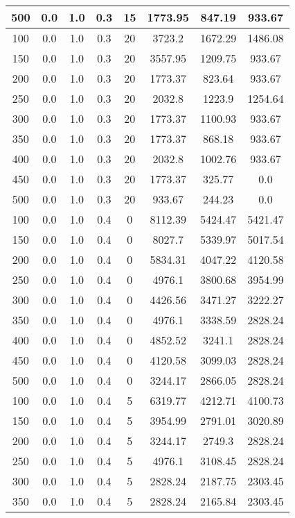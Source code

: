 \documentclass[a4paper, 12pt]{extreport}
\begin{document}
\begin{itemize}
\begin{longtable}{|c|c|c|c|c|c|c|c|}
			500 & 0.0 & 1.0 & 0.3 & 15 & 1773.95 & 847.19 & 933.67 \\\hline
			100 & 0.0 & 1.0 & 0.3 & 20 & 3723.2 & 1672.29 & 1486.08 \\\hline
			150 & 0.0 & 1.0 & 0.3 & 20 & 3557.95 & 1209.75 & 933.67 \\\hline
			200 & 0.0 & 1.0 & 0.3 & 20 & 1773.37 & 823.64 & 933.67 \\\hline
			250 & 0.0 & 1.0 & 0.3 & 20 & 2032.8 & 1223.9 & 1254.64 \\\hline
			300 & 0.0 & 1.0 & 0.3 & 20 & 1773.37 & 1100.93 & 933.67 \\\hline
			350 & 0.0 & 1.0 & 0.3 & 20 & 1773.37 & 868.18 & 933.67 \\\hline
			400 & 0.0 & 1.0 & 0.3 & 20 & 2032.8 & 1002.76 & 933.67 \\\hline
			450 & 0.0 & 1.0 & 0.3 & 20 & 1773.37 & 325.77 & 0.0 \\\hline
			500 & 0.0 & 1.0 & 0.3 & 20 & 933.67 & 244.23 & 0.0 \\\hline
			100 & 0.0 & 1.0 & 0.4 & 0 & 8112.39 & 5424.47 & 5421.47 \\\hline
			150 & 0.0 & 1.0 & 0.4 & 0 & 8027.7 & 5339.97 & 5017.54 \\\hline
			200 & 0.0 & 1.0 & 0.4 & 0 & 5834.31 & 4047.22 & 4120.58 \\\hline
			250 & 0.0 & 1.0 & 0.4 & 0 & 4976.1 & 3800.68 & 3954.99 \\\hline
			300 & 0.0 & 1.0 & 0.4 & 0 & 4426.56 & 3471.27 & 3222.27 \\\hline
			350 & 0.0 & 1.0 & 0.4 & 0 & 4976.1 & 3338.59 & 2828.24 \\\hline
			400 & 0.0 & 1.0 & 0.4 & 0 & 4852.52 & 3241.1 & 2828.24 \\\hline
			450 & 0.0 & 1.0 & 0.4 & 0 & 4120.58 & 3099.03 & 2828.24 \\\hline
			500 & 0.0 & 1.0 & 0.4 & 0 & 3244.17 & 2866.05 & 2828.24 \\\hline
			100 & 0.0 & 1.0 & 0.4 & 5 & 6319.77 & 4212.71 & 4100.73 \\\hline
			150 & 0.0 & 1.0 & 0.4 & 5 & 3954.99 & 2791.01 & 3020.89 \\\hline
			200 & 0.0 & 1.0 & 0.4 & 5 & 3244.17 & 2749.3 & 2828.24 \\\hline
			250 & 0.0 & 1.0 & 0.4 & 5 & 4976.1 & 3108.45 & 2828.24 \\\hline
			300 & 0.0 & 1.0 & 0.4 & 5 & 2828.24 & 2187.75 & 2303.45 \\\hline
			350 & 0.0 & 1.0 & 0.4 & 5 & 2828.24 & 2165.84 & 2303.45 \\\hline

\end{longtable}
\end{itemize}
\end{document}
